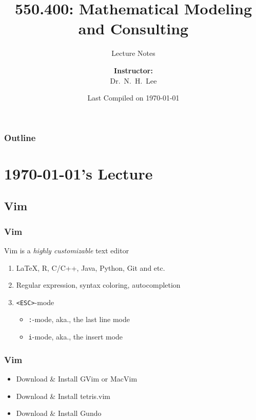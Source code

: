 \documentclass[hyperref={colorlinks=false},handout,10pt]{beamer}
\title{{\color{blue} \LARGE 550.400: Mathematical Modeling and Consulting\newline} }
\subtitle{{\color{red} \large Lecture Notes} }
\author{ 
    {\bf{Instructor:}} \\ 
Dr.~N.~H.~Lee \\ 
    \vspace{5pt}
}
\institute{JHU AMS 2012 FALL}
\date{\mygreen Last Compiled on \today}
\let\olditem\item
\renewcommand{\item}{\setlength{\itemsep}{0.5\baselineskip}\olditem}
\begin{document}
\begin{frame}[plain]
  \titlepage
\end{frame}

\begin{frame}
  \frametitle{Outline}
  \tableofcontents
\end{frame}

\section{\today's Lecture}
\subsection{Vim}

\begin{frame}
    \frametitle{Vim}
    \begin{block}
        {Vim is a \emph{highly customizable} text editor}
    \vskip0.1in
    \begin{enumerate}
        \item \LaTeX, R, C/C++, Java, Python, Git and etc.
        \item Regular expression, syntax coloring, autocompletion
        \item \texttt{<ESC>}-mode
        \begin{itemize}
            \item \texttt{:}-mode, aka., the last line mode
            \item \texttt{i}-mode, aka., the insert mode
        \end{itemize}
    \end{enumerate}
    \end{block}
\end{frame}

\begin{frame}
    \frametitle{Vim}
    \begin{itemize}
        \item Download \& Install GVim or MacVim
        \item Download \& Install tetris.vim
        \item Download \& Install Gundo 
    \end{itemize}
\end{frame}
\end{document}
